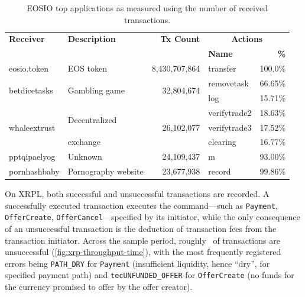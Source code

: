 \begin{table}[tb]
	\centering
	\caption[EOSIO top applications]{EOSIO top applications as measured using the number of received transactions.}
	\label{tab:eos-top-applications}
	\setlength{\tabcolsep}{2pt}
	\begin{tabular}{l l r l r}
		\toprule
		\textbf{Receiver}             & \textbf{Description}           & \textbf{Tx Count}           & \multicolumn{2}{c}{\bf Actions}           \\
		                              &                                &                             & \bf Name                        & \bf \%  \\
		\midrule
		eosio.token                   & EOS token                      & 8,430,707,864               & transfer                        & 100.0\% \\
		\midrule
		\multirow{2}{*}{betdicetasks} & \multirow{2}{*}{Gambling game} & \multirow{2}{*}{32,804,674} & removetask                      & 66.65\% \\
		                              &                                &                             & log                             & 15.71\% \\
		\midrule
		\multirow{3}{*}{whaleextrust} & \multirow{2}{*}{Decentralized} & \multirow{3}{*}{26,102,077} & verifytrade2                    & 18.63\% \\
		                              &                                &                             & verifytrade3                    & 17.52\% \\
		                              & exchange                       &                             & clearing                        & 16.77\% \\
		\midrule
		pptqipaelyog                  & Unknown                        & 24,109,437                  & m                               & 93.00\% \\
		\midrule
		pornhashbaby                  & Pornography website            & 23,677,938                  & record                          & 99.86\% \\
		\bottomrule
	\end{tabular}
\end{table}


On XRPL, both successful and unsuccessful transactions are recorded. A successfully executed transaction executes the command---such as \texttt{Payment}, \texttt{OfferCreate}, \texttt{OfferCancel}---specified by its initiator, while the only consequence of an unsuccessful transaction is the deduction of transaction fees from the transaction initiator.
Across the sample period, roughly~ of transactions are unsuccessful (\autoref{fig:xrp-throughput-time}), with the most frequently registered errors being \texttt{PATH\_DRY} for \texttt{Payment} (insufficient liquidity, hence ``dry'', for specified payment path) and \texttt{tecUNFUNDED\_OFFER} for \texttt{OfferCreate} (no funds for the currency promised to offer by the offer creator).

